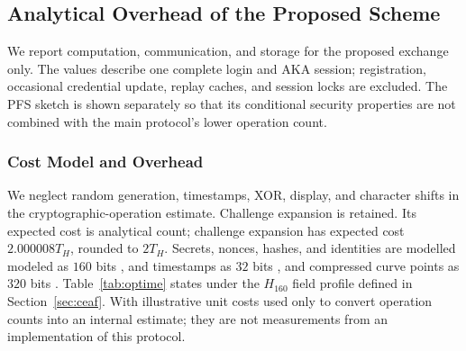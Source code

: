 \documentclass[cmc,article,submit,moreauthors,pdftex]{Definitions/tsp}
\providecommand{\DIFadd}[1]{{\protect\color{blue} \sf #1}} %
\providecommand{\DIFdel}[1]{{\protect\color{red} \scriptsize #1}} %
\providecommand{\DIFaddbegin}{} %
\providecommand{\DIFaddend}{} %
\providecommand{\DIFdelbegin}{} %
\providecommand{\DIFdelend}{} %
\begin{document}
\subsection{Analytical Overhead of the Proposed Scheme}

We report computation, communication, and storage for \DIFdelbegin \DIFdel{the proposed exchange only. The values describe }\DIFdelend one complete login and AKA session; registration, \DIFdelbegin \DIFdel{occasional credential }\DIFdelend update, replay caches, and session locks are excluded.
\DIFdelbegin \DIFdel{The PFS sketch is shown separately so that its conditional security properties are not combined with the main protocol's lower operation count.
}\DIFdelend 

\DIFdelbegin %
\DIFdelend \DIFaddbegin \subsubsection{Cost Model and Overhead}\DIFaddend \label{sec:costmodel}

We neglect random generation, timestamps, XOR, display, and character shifts in the \DIFdelbegin \DIFdel{cryptographic-operation estimate. Challenge expansion is retained. Its expected cost is }\DIFdelend \DIFaddbegin \DIFadd{analytical count; challenge expansion has expected cost }\DIFaddend $2.000008T_H$, rounded to $2T_H$. Secrets, nonces, hashes, and identities are \DIFdelbegin \DIFdel{modelled }\DIFdelend \DIFaddbegin \DIFadd{modeled }\DIFaddend as $160$ bits \DIFdelbegin \DIFdel{, }\DIFdelend \DIFaddbegin \DIFadd{and }\DIFaddend timestamps as $32$ bits \DIFdelbegin \DIFdel{, and compressed curve points as $320$ bits \cite{mao2018,das2017,liu2017temporal,yu2020}. Table~\ref{tab:optime} states }\DIFdelend \DIFaddbegin \DIFadd{under the $H_{160}$ field profile defined in Section~\ref{sec:ceaf}. With }\DIFaddend illustrative unit costs \DIFdelbegin \DIFdel{used only to convert operation counts into an internal estimate; they are not measurements from an implementation of this protocol. }%
\end{document}
